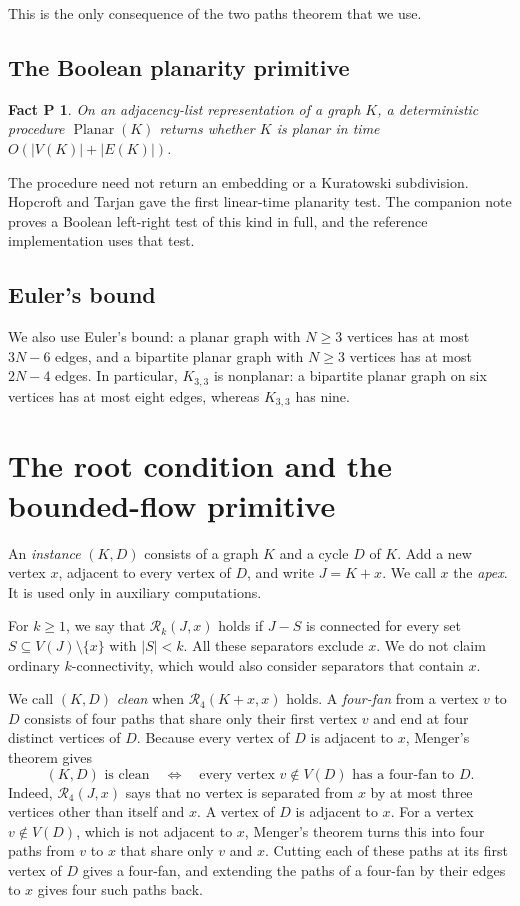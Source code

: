 \documentclass[11pt]{article}
\newtheorem*{factP}{Fact P}
\DeclareMathOperator{\Planar}{Planar}
\newcommand{\cR}{\mathcal R}
\begin{document}
This is the only consequence of the two paths theorem that we use.

\subsection*{The Boolean planarity primitive}

\begin{factP}
On an adjacency-list representation of a graph $K$, a deterministic procedure
$\Planar(K)$ returns whether $K$ is planar in time $O(|V(K)|+|E(K)|)$.
\end{factP}

The procedure need not return an embedding or a Kuratowski subdivision.
Hopcroft and Tarjan \cite{HT74} gave the first linear-time planarity test. The
companion note \cite{HJ26} proves a Boolean left-right test of this kind in
full, and the reference implementation uses that test.

\subsection*{Euler's bound}

We also use Euler's bound: a planar graph with $N\ge3$ vertices has at most
$3N-6$ edges, and a bipartite planar graph with $N\ge3$ vertices has at most
$2N-4$ edges. In particular, $K_{3,3}$ is nonplanar: a bipartite planar graph
on six vertices has at most eight edges, whereas $K_{3,3}$ has nine.

\section{The root condition and the bounded-flow primitive}\label{sec:root}

An \emph{instance} $(K,D)$ consists of a graph $K$ and a cycle $D$ of $K$. Add
a new vertex $x$, adjacent to every vertex of $D$, and write $J=K+x$. We call
$x$ the \emph{apex}. It is used only in auxiliary computations.

For $k\ge1$, we say that $\cR_k(J,x)$ holds if $J-S$ is connected for every set
$S\subseteq V(J)\setminus\{x\}$ with $|S|<k$. All these separators exclude
$x$. We do not claim ordinary $k$-connectivity, which would also consider
separators that contain $x$.

We call $(K,D)$ \emph{clean} when $\cR_4(K+x,x)$ holds. A \emph{four-fan} from
a vertex $v$ to $D$ consists of four paths that share only their first vertex
$v$ and end at four distinct vertices of $D$. Because every vertex of $D$ is
adjacent to $x$, Menger's theorem gives
\begin{equation*}
(K,D)\text{ is clean}
\quad\Longleftrightarrow\quad
\text{every vertex }v\notin V(D)\text{ has a four-fan to }D.
\end{equation*}
Indeed, $\cR_4(J,x)$ says that no vertex is separated from $x$ by at most three
vertices other than itself and $x$. A vertex of $D$ is adjacent to $x$. For a
vertex $v\notin V(D)$, which is not adjacent to $x$, Menger's theorem turns
this into four paths from $v$ to $x$ that share only $v$ and $x$. Cutting each
of these paths at its first vertex of $D$ gives a four-fan, and extending the
paths of a four-fan by their edges to $x$ gives four such paths back.
\end{document}
